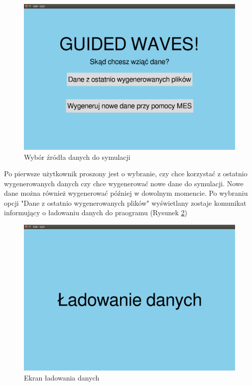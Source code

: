 \begin{figure}[h]
\centering
\includegraphics[width=13cm]{Zdjecia/5/kasia/gui1}
\caption{Wybór źródła danych do symulacji}
\label{fig:gui1}
\end{figure}

Po pierwsze użytkownik proszony jest o wybranie, czy chce korzystać z ostatnio wygenerowanych danych czy chce wygenerować nowe dane do symulacji. Nowe dane można również wygenerować później w dowolnym momencie. Po wybraniu opcji "Dane z ostatnio wygenerowanych plików" wyświetlany zostaje komunikat informujący o ładowaniu danych do praogramu (Rysunek \ref{fig:gui2})

\begin{figure}[h]
\centering
\includegraphics[width=13cm]{Zdjecia/5/kasia/gui2}
\caption{Ekran ładowania danych}
\label{fig:gui2}
\end{figure}

